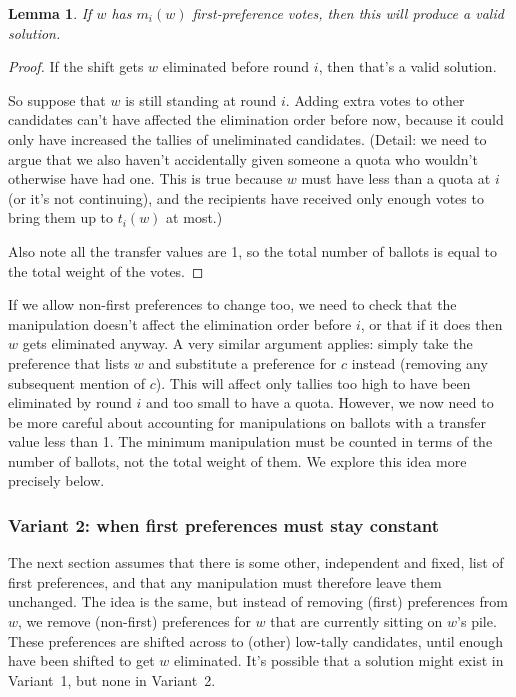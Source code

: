 \documentclass[10pt,a4paper]{article}
\newtheorem{lemma}{Lemma}
\begin{document}
{\begin{lemma}
If $w$ has $m_i(w)$ first-preference votes, then this will produce a valid solution.  
\end{lemma}
\begin{proof}
If the shift gets $w$ eliminated before round $i$, then that's a valid solution.  

So suppose that $w$ is still standing at round $i$.  Adding extra votes to other candidates can't have affected the elimination order before now, because it could only have increased the tallies of uneliminated candidates.  (Detail: we need to argue that we also haven't accidentally given someone a quota who wouldn't otherwise have had one.  This is true because $w$ must have less than a quota at $i$ (or it's not continuing), and the recipients have received only enough votes to bring them up to $t_i(w)$ at most.)

Also note all the transfer values are 1, so the total number of ballots is equal to the total weight of the votes.
\end{proof}

If we allow non-first preferences to change too, we need to check that the manipulation doesn't affect the elimination order before $i$, or that if it does then $w$ gets eliminated anyway.  A very similar argument applies: simply take the preference that lists $w$ and substitute a preference for $c$ instead (removing any subsequent mention of $c$).  This will affect only tallies too high to have been eliminated by round $i$ and too small to have a quota.  However, we now need to be more careful about accounting for manipulations on ballots with a transfer value less than 1.  The minimum manipulation must be counted in terms of the number of ballots, not the total weight of them.  We explore this idea more precisely below.

\subsubsection{Variant 2: when first preferences must stay constant}
The next section assumes that there is some other, independent and fixed, list of first preferences, and that any manipulation must therefore leave them unchanged.  The idea is the same, but instead of removing (first) preferences from $w$, we remove (non-first) preferences for $w$ that are currently sitting on $w$'s pile.  These preferences are shifted across to (other) low-tally candidates, until enough have been shifted to get $w$ eliminated.  It's possible that a solution might exist in Variant~1, but none in Variant~2.

}
\end{document}
